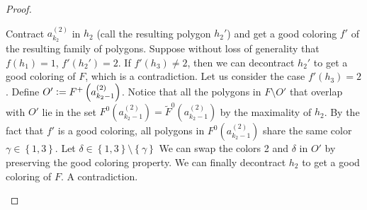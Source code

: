 \documentclass[12pt]{article}
\theoremstyle{definition}
\newcommand{\defeq}{\vcentcolon=}
\def\rxhalf{0.5/2}
\def\ryhalf{0.4/2}
\def\rxonepoint{1.5/2}
\def\ryonepoint{0.9/2}
\def\rxstwopoint{(3 - 1.5/2)/2}
\def\rxtwopoint{2.5/2}
\def\rytwopoint{1.5/2}
\def\rxfivepoint{5.5/2}
\def\ryfivepoint{3.0/2}
\begin{document}
\begin{proof}
\begin{itemize}
\begin{figure}[ht]
\begin{center}
{
             }
             \end{center}
             \caption{}
             \label{figure:t=3}
             \end{figure}

             Contract $a_{k_2}^{\left(2\right)}$ 
             in $h_2$ (call the resulting
             polygon $h_2'$)
             and get a good coloring
             $f'$ of the resulting family
             of polygons.
             Suppose without loss of
             generality that $f\left(h_1\right) = 1$,
             $f'\left(h_2'\right) = 2$.
             If $f'\left(h_3\right) \neq 2$, 
             then we can decontract $h_2'$ 
             to get a good coloring of $F$, 
             which is a contradiction.
             Let us consider the case
             $f'\left(h_3\right) = 2$.
             Define $O' \defeq F^{+}\left(a_{k_2 - 1}^{\left(2\right)}\right)$.
             Notice that all the polygons in
             $F \setminus O'$ that overlap with
             $O'$ lie in the set 
             $F^{0}\left(a_{k_2-1}^{\left(2\right)}\right) =
             \widetilde{F}^{0}\left(a_{k_2-1}^{\left(2\right)}\right)$
             by the maximality of $h_2$.
             By the fact that $f'$ is a
             good coloring, all polygons in $F^{0}\left(
             a_{k_2-1}^{\left(2\right)}\right)$
             share the same color $\gamma \in \left\{1, 3\right\}$.
             Let $\delta \in \left\{1, 3\right\} 
             \setminus \left\{\gamma\right\}$
             We can swap the colors 2 and $\delta$
             in $O'$ by preserving the good coloring 
             property.
             We can finally decontract $h_2$ to get
             a good coloring of $F$. 
             A contradiction.


\end{itemize}
\end{proof}
\end{document}
